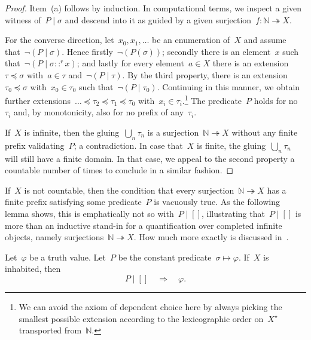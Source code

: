 \documentclass[envcountsect,envcountsame,runningheads]{llncs}
\newcommand{\NN}{\mathbb{N}}
\renewcommand{\_}{\mathpunct{.}\,}
\begin{document}
\begin{proof}
Item~(a) follows by induction. In computational terms, we inspect a given
witness of~$P \mid \sigma$ and descend into it as guided by a given
surjection~$f : \NN \twoheadrightarrow X$.

For the converse direction, let~$x_0,x_1,\ldots$ be an enumeration of~$X$ and
assume that~$\neg(P \mid \sigma)$. Hence firstly~$\neg(P(\sigma))$; secondly there is an
element~$x$ such that~$\neg(P \mid \sigma ::^r x)$; and lastly for every element~$a
\in X$ there is an extension~$\tau \preceq \sigma$ with~$a \in \tau$
and~$\neg(P \mid \tau)$. By the third property,
there is an extension~$\tau_0 \preceq
\sigma$ with~$x_0 \in \tau_0$ such that~$\neg(P \mid \tau_0)$. Continuing in
this manner, we obtain further extensions~$\ldots \preceq \tau_2 \preceq \tau_1
\preceq \tau_0$ with~$x_i \in \tau_i$.\footnote{We can avoid the axiom of
dependent choice here by always picking the smallest possible extension
according to the lexicographic order on~$X^\star$ transported from~$\NN$.}
The predicate~$P$ holds for no~$\tau_i$ and, by monotonicity, also for no
prefix of any~$\tau_i$.

If~$X$ is infinite, then the gluing~$\bigcup_n \tau_n$ is a surjection~$\NN
\twoheadrightarrow X$ without any finite prefix validating~$P$; a
contradiction. In case that~$X$ is finite, the gluing~$\bigcup_n \tau_n$ will
still have a finite domain. In that case, we appeal to the second property a
countable number of times to conclude in a similar fashion.
\end{proof}

If~$X$ is not countable, then the condition that every surjection~$\NN
\twoheadrightarrow X$ has a finite prefix satisfying some predicate~$P$ is
vacuously true. As the following lemma shows, this is emphatically not so
with~$P \mid []$, illustrating that~$P \mid []$ is more than an inductive
stand-in for a quantification over completed infinite objects, namely
surjections~$\NN \twoheadrightarrow X$. How much more exactly is discussed
in~\cite{blechschmidt:multiverse}.

\begin{lemma}Let~$\varphi$ be a truth value. Let~$P$ be the constant
predicate~$\sigma \mapsto \varphi$. If~$X$ is inhabited, then
\[ P \mid [] \quad\Longrightarrow\quad \varphi. \]
\end{lemma}
\end{document}
